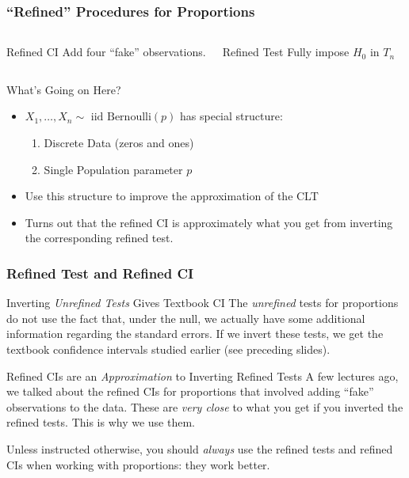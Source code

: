 \documentclass[handout]{beamer}
\begin{document}
\begin{frame}
	\frametitle{``Refined'' Procedures for Proportions}
\begin{columns}
	\begin{block}
		{Refined CI}
		Add four ``fake'' observations.
	\end{block}
		\begin{block}
			{Refined Test} Fully impose $H_0$ in $T_n$
		\end{block}
\end{columns}

\vspace{2em}

\begin{block}
	{What's Going on Here?}
		\begin{itemize}
		\item $X_1, \hdots, X_n \sim \mbox{ iid Bernoulli}(p)$ has special structure:
			\begin{enumerate}
				\item Discrete Data (zeros and ones)
				\item Single Population parameter $p$ 
			\end{enumerate}
		\item Use this structure to improve the approximation of the CLT
		\item Turns out that the refined CI is approximately what you get from inverting the corresponding refined test.
	\end{itemize}
\end{block}
\end{frame}

\begin{frame}
\frametitle{Refined Test and Refined CI}
\small
\begin{block}{Inverting \emph{Unrefined Tests} Gives Textbook CI}
The \emph{unrefined} tests for proportions do not use the fact that, under the null, we actually have some additional information regarding the standard errors. If we invert these tests, we get the textbook confidence intervals studied earlier (see preceding slides). 
\end{block}

\pause

\begin{block}{Refined CIs are an \emph{Approximation} to Inverting Refined Tests}
A few lectures ago, we talked about the refined CIs for proportions that involved adding ``fake'' observations to the data. These are \emph{very close} to what you get if you inverted the refined tests. \alert{This is why we use them.}
\end{block}

\pause

\vspace{1em} 
\large
\alert{Unless instructed otherwise, you should \emph{always} use the refined tests and refined CIs when working with proportions: they work better.}

\end{frame}
\end{document}
